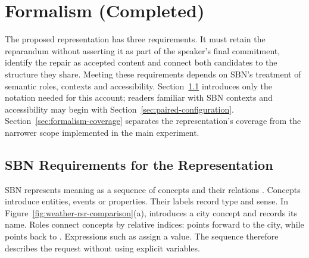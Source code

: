 \section{Formalism (Completed)}
\label{sec:formalism}
The proposed representation has three requirements. It must retain the
reparandum without asserting it as part of the speaker's final commitment,
identify the repair as accepted content and connect both candidates to the
structure they share. Meeting these requirements depends on SBN's treatment of
semantic roles, contexts and accessibility. Section~\ref{sec:sbn-brief}
introduces only the notation needed for this account; readers familiar with
SBN contexts and accessibility may begin with
Section~\ref{sec:paired-configuration}. Section~\ref{sec:formalism-coverage}
separates the representation's coverage from the narrower scope implemented
in the main experiment.

\subsection{SBN Requirements for the Representation}
\label{sec:sbn-brief}

SBN represents meaning as a sequence of concepts and their relations
\citep{bosSequenceNotationCatching2023}. Concepts introduce entities, events
or properties. Their labels record type and sense. In
Figure~\ref{fig:weather-rsr-comparison}(a),  introduces a
city concept and  records its name. Roles connect concepts by
relative indices:  points forward to the city, while
 points back to . Expressions such as
 assign a value. The sequence therefore describes the request
without using explicit variables.

